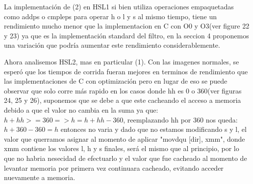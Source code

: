\documentclass[a4paper]{article}
\begin{document}
La implementación de (2) en HSL1 si bien utiliza operaciones empaquetadas como addps o cmpleps para operar h o l y s al mismo tiempo, tiene un rendimiento mucho menor que la implementacion en C con O0 y O3(ver figure 22 y 23) ya que es la implementación standard del filtro, en la seccion 4 proponemos una variación que podría aumentar este rendimiento considerablemente.\newline

Ahora analisemos HSL2, mas en particular (1). Con las imagenes normales, se esperó que los tiempos de corrida fueran mejores en terminos de rendimiento que las implementaciones de C con optimización pero en lugar de eso se puede observar que solo corre más rapido en los casos donde hh es 0 o 360(ver figuras 24, 25 y 26), suponemos que se debe a que este cacheando el acceso a memoria debido a que el valor no cambia en la suma ya que: $h + hh >= 360 =>h = h+hh-360$, reemplazando hh por 360 nos queda: $h + 360 - 360 = h$ entonces no varia y dado que no estamos modificando s y l, el valor que querramos asignar al momento de aplicar "movdqu [dir], xmm", donde xmm contiene los valores l, h y s finales, será el mismo que al principio, por lo que no habria nesecidad de efectuarlo y el valor que fue cacheado al momento de levantar memoria por primera vez continuara cacheado, evitando acceder nuevamente a memoria.  
\end{document}
